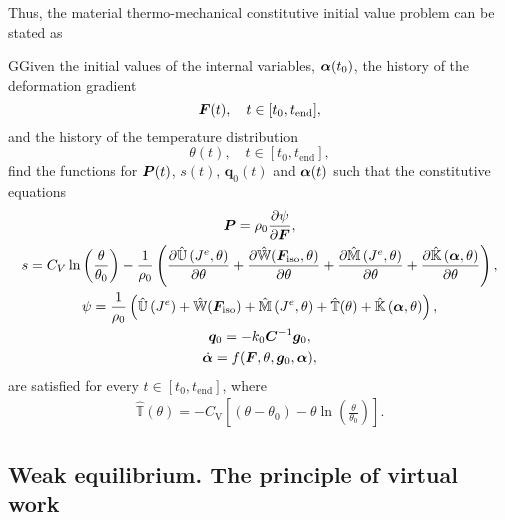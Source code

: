 Thus, the material thermo-mechanical constitutive initial value problem can be stated as
    \begin{problem}
    GGiven the initial values of the internal variables, $\bm{\alpha}(t_0)$, the history of the deformation gradient
    \begin{equation}
        \bm{F}(t),\quad t\in[t_0,t_\text{end}],
    \end{equation}
    and the history of the temperature distribution
    \begin{equation}
    \theta(t),\quad t\in[t_0,t_\text{end}],
    \end{equation}
    find the functions for $\bm{P}(t)$, \(s(t)\), \(\bm q_0(t)\) and $\bm{\alpha}(t)$ such that the constitutive equations
    \begin{gather}
        \bm{P} = \rho_0 \frac{\partial \psi}{\partial \bm{F}},\\
        s = C_{V} \ln \left(\frac{\theta}{\theta_{0}}\right)-\frac{1}{\rho_{0}}\left(\frac{\partial \hat{\mathbb{U}}\left(J^e,\theta\right)}{\partial \theta} + \frac{\partial \hat{\mathbb{W}}(\bm{F}_\text{iso},\theta)}{\partial \theta} + \frac{\partial \hat{\mathbb{M}}\left(J^{e}, \theta\right)}{\partial \theta}+\frac{\partial \hat{\mathbb{K}}\left(\bm \alpha, \theta\right)}{\partial \theta}\right),\\
        \psi =\frac{1}{\rho_0}\left( \hat{\mathbb{U}}\left(J^{e}\right)+\hat{\mathbb{W}}(\bm F_\text{iso})+\hat{\mathbb{M}}\left(J^{e}, \theta\right)+\hat{\mathbb{T}}(\theta)+\hat{\mathbb{K}}\left(\boldsymbol{\alpha}, \theta\right)\right),\\
        \bm q_0 = - k_0 \bm C^{-1} \bm g_0,\\
        \dot{\bm{\alpha}} = f(\bm{F}, \theta, \bm g_0 ,\bm{\alpha}),
    \end{gather}
    are satisfied for every $t\in [t_0, t_\text{end}]$, where
    \begin{gather}
    \hat{\mathbb T}(\theta) = - C_{\mathrm{V}}\left[\left(\theta-\theta_{0}\right)-\theta \ln \left(\frac{\theta}{\theta_{0}}\right)\right].
    \end{gather}
    \end{problem}

\subsection{Weak equilibrium. The principle of virtual work}

